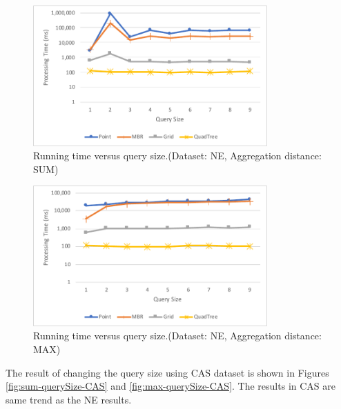 \documentclass[a4paper,11pt]{report}
\theoremstyle{mytheoremstyle}
\begin{document}
\begin{figure}
    \begin{center}
        \includegraphics[width=0.8\textwidth]{src/images/NE-SUM-Q.pdf}
    \end{center}
    \caption{Running time versus query size.(Dataset: NE, Aggregation distance: SUM)}
    \label{fig:sum-querySize}
\end{figure}

\begin{figure}
    \begin{center}
        \includegraphics[width=0.8\textwidth]{src/images/NE-MAX-Q.pdf}
    \end{center}
    \caption{Running time versus query size.(Dataset: NE, Aggregation distance: MAX)}
    \label{fig:max-querySize}
\end{figure}

The result of changing the query size using CAS dataset is shown in Figures \ref{fig:sum-querySize-CAS} and  \ref{fig:max-querySize-CAS}. The results in CAS are same trend as the NE results.
\end{document}
